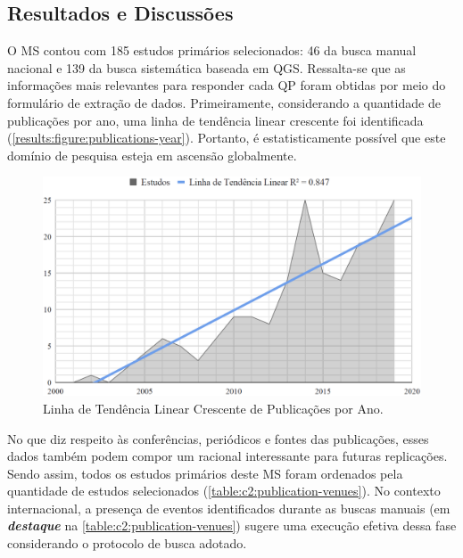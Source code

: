 \subsection{Resultados e Discussões}
\label{ms:resultados}

O MS contou com 185 estudos primários selecionados: 46 da busca manual nacional e 139 da busca sistemática baseada em QGS. Ressalta-se que as informações mais relevantes para responder cada QP foram obtidas por meio do formulário de extração de dados. Primeiramente, considerando a quantidade de publicações por ano, uma linha de tendência linear crescente foi identificada (\autoref{results:figure:publications-year}). Portanto, é estatisticamente possível que este domínio de pesquisa esteja em ascensão globalmente.


\begin{figure}[htb]
\centering 
\caption{Linha de Tendência Linear Crescente de Publicações por Ano.}
\label{results:figure:publications-year}
\includegraphics[width=1\textwidth]{images/chapter2-sm-publications-timeline.png}
\fautor
\end{figure}


No que diz respeito às conferências, periódicos e fontes das publicações, esses dados também podem compor um racional interessante para futuras replicações. Sendo assim, todos os estudos primários deste MS foram ordenados pela quantidade de estudos selecionados (\autoref{table:c2:publication-venues}). No contexto internacional, a presença de eventos identificados durante as buscas manuais (em \textbf{\textit{destaque}} na \autoref{table:c2:publication-venues}) sugere uma execução efetiva dessa fase considerando o protocolo de busca adotado.

